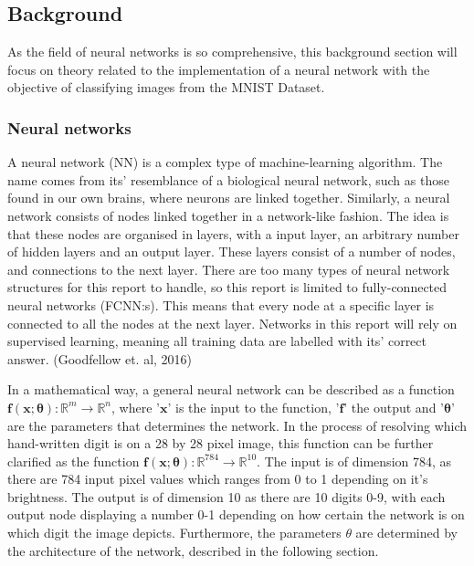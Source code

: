 \documentclass{article}
\begin{document}

\subsection{Background}
\noindent As the field of neural networks is so comprehensive, this background section will focus on theory related to the implementation of a neural network with the objective of classifying images from the MNIST Dataset.

\subsubsection{Neural networks}
A neural network (NN) is a complex type of machine-learning algorithm. The name comes from its' resemblance of a biological neural network, such as those found in our own brains, where neurons are linked together. Similarly, a neural network consists of nodes linked together in a network-like fashion. The idea is that these nodes are organised in layers, with a input layer, an arbitrary number of hidden layers and an output layer. These layers consist of a number of nodes, and connections to the next layer. There are too many types of neural network structures for this report to handle, so this report is limited to fully-connected neural networks (FCNN:s). This means that every node at a specific layer is connected to all the nodes at the next layer. Networks in this report will rely on supervised learning, meaning all training data are labelled with its' correct answer. (Goodfellow et. al, 2016)

\noindent In a mathematical way, a general neural network can be described as a function $\mathbf{f}(\mathbf{x}; \mathbf{\theta}) : \mathbb{R}^m \xrightarrow{} \mathbb{R}^n$, where '$\mathbf{x}$' is the input to the function, '$\mathbf{f}$' the output and '$\mathbf{\theta}$' are the parameters that determines the network. In the process of resolving which hand-written digit is on a 28 by 28 pixel image, this function can be further clarified as the function $\mathbf{f}(\mathbf{x}; \mathbf{\theta}) : \mathbb{R}^{784} \xrightarrow{} \mathbb{R}^{10}$. The input is of dimension 784, as there are 784 input pixel values which ranges from 0 to 1 depending on it's brightness. The output is of dimension 10 as there are 10 digits 0-9, with each output node displaying a number 0-1 depending on how certain the network is on which digit the image depicts. Furthermore, the parameters $\theta$ are determined by the architecture of the network, described in the following section.
\end{document}
